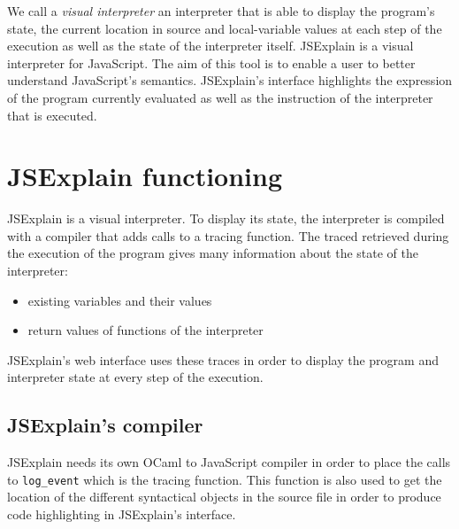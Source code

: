 \documentclass[twocolumn]{article}
\begin{document}
We call a \emph{visual interpreter} an interpreter that is able to display the program's state,
the current location in source and local-variable values at each step of the execution as well as
the state of the interpreter itself. JSExplain is a visual interpreter for JavaScript. The aim of
this tool is to enable a user to better understand JavaScript's semantics. JSExplain's interface
highlights the expression of the program currently evaluated as well as the instruction of
the interpreter that is executed.

\section{JSExplain functioning}

JSExplain is a visual interpreter. To display its state, the interpreter is compiled with a
compiler that adds calls to a tracing function. The traced retrieved during the execution of the
program gives many information about the state of the interpreter:

\begin{itemize}
	\item existing variables and their values
	\item return values of functions of the interpreter
\end{itemize}

JSExplain's web interface uses these traces in order to display the program and interpreter state
at every step of the execution.

\subsection{JSExplain's compiler}


JSExplain needs its own OCaml to JavaScript compiler in order to place the calls to
\verb|log_event| which is the tracing function. This function is also used to get the location
of the different syntactical objects in the source file in order to produce code highlighting in
JSExplain's interface.
\end{document}

